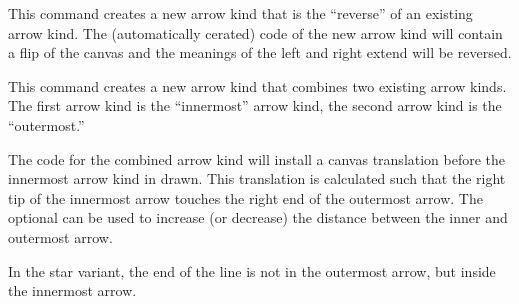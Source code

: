 \begin{command}{\pgfarrowsdeclarereversed{}}
  This command creates a new arrow kind that is the ``reverse'' of an
  existing arrow kind. The (automatically cerated) code of the new
  arrow kind will contain a flip of the canvas and the meanings of the
  left and right extend will be reversed. 

\begin{codeexample}[]
%
\begin{pgfpicture}
  \pgfsetlinewidth{1ex}
  \pgfpathmoveto{\pgfpointorigin}
  \pgfpathlineto{\pgfpoint{4cm}{2cm}}
\end{pgfpicture}
\end{codeexample}
\end{command}



\begin{command}{\pgfarrowsdeclarecombine\opt{|*|}}
  This command creates a new arrow kind that combines two existing
  arrow kinds. The first arrow kind is the ``innermost'' arrow kind,
  the second arrow kind is the ``outermost.''

  The code for the combined arrow kind will install a canvas
  translation before the innermost arrow kind in drawn. This
  translation is calculated such that the right tip of the innermost
  arrow touches the right  end of the outermost arrow. The optional
   can be used to increase (or decrease) the distance
  between the inner and outermost arrow.

\begin{codeexample}[]
%
\begin{pgfpicture}
  \pgfsetlinewidth{1ex}
  \pgfpathmoveto{\pgfpointorigin}
  \pgfpathlineto{\pgfpoint{4cm}{2cm}}
\end{pgfpicture}
\end{codeexample}

  In the star variant, the end of the line is not in the outermost
  arrow, but inside the innermost arrow.

\begin{codeexample}[]
%
\begin{pgfpicture}
  \pgfsetlinewidth{1ex}
  \pgfpathmoveto{\pgfpointorigin}
  \pgfpathlineto{\pgfpoint{4cm}{2cm}}
\end{pgfpicture}
\end{codeexample}
\end{command}


